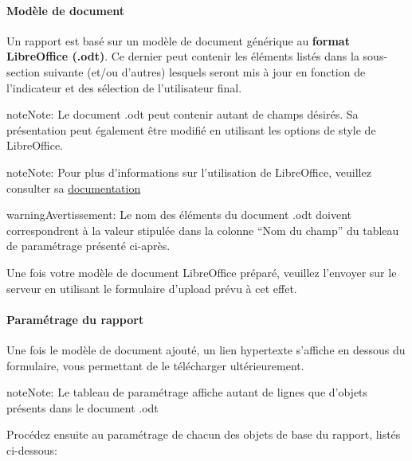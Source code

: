 \documentclass[letterpaper,10pt,french]{sphinxmanual}
\begin{document}
\paragraph{Modèle de document}

Un rapport est basé sur un modèle de document générique au \textbf{format
LibreOffice (.odt)}. Ce dernier peut contenir les éléments listés
dans la sous-section suivante (et/ou d'autres) lesquels seront mis à
jour en fonction de l'indicateur et des sélection de l'utilisateur
final.

\begin{notice}{note}{Note:}
Le document .odt peut contenir autant de champs désirés. Sa présentation peut également être modifié en utilisant les options de style de LibreOffice.
\end{notice}

\begin{notice}{note}{Note:}
Pour plus d'informations sur l'utilisation de LibreOffice, veuillez consulter sa \href{http://www.libreoffice.org/get-help/documentation/}{documentation}
\end{notice}

\begin{notice}{warning}{Avertissement:}
Le nom des éléments du document .odt doivent correspondrent à la valeur stipulée dans la colonne ``Nom du champ'' du tableau de paramétrage présenté ci-après.
\end{notice}

Une fois votre modèle de document LibreOffice préparé, veuillez l'envoyer sur le serveur en utilisant le formulaire d'upload prévu à cet effet.
\paragraph{Paramétrage du rapport}

Une fois le modèle de document ajouté, un lien hypertexte s'affiche en dessous du formulaire, vous permettant de le télécharger ultérieurement.

\begin{notice}{note}{Note:}
Le tableau de paramétrage affiche autant de lignes que d'objets présents dans le document .odt
\end{notice}

Procédez ensuite au paramétrage de chacun des objets de base du rapport, listés ci-dessous:
\end{document}

